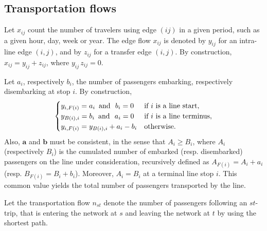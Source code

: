 \documentclass{llncs}
\begin{document}
\subsection{Transportation flows}
\label{Transportation flows}
Let  $x_{ij}$ count the number of travelers using edge $(ij)$ in a given period, such as a given hour, day, week or  year.  The edge flow $x_{ij}$ is denoted by $y_{ij}$ for an intra-line edge $(i,j)$, and 
by $z_{ij}$ for a transfer edge $(i,j)$. By construction, $x_{ij}=y_{ij}+z_{ij}$, where $y_{ij}\,  z_{ij}=0$. 

\vspace*{0.1cm}


Let $a_i$, respectively $b_i$, the number of passengers embarking, respectively disembarking at stop $i$. By construction, 
\begin{equation}
\label{bilan1ligne}
\begin{cases}
 y_{i,F(i)}=a_i \text{\,  and } b_i=0   & \text{if $i$ is a line start}, \\
y_{B(i),i}=b_i \text{\,  and } a_i=0   & \text{if $i$ is a line terminus}, \\
 y_{i,F(i)}=y_{B(i),i}+a_i-b_i     & \text{otherwise}.
\end{cases}
\end{equation}
Also, $\mathbf{a}$ and $\mathbf{b}$ must be consistent, in the sense that $A_i\ge B_i$, where $A_i$ (respectively $B_i$) is the cumulated number of embarked 
(resp. disembarked) passengers on the line under consideration, recursively defined as $A_{F(i)}=A_i+a_i$ (resp. $B_{F(i)}=B_i+b_i$). Moreover,  $A_i=B_i$ at a terminal line stop $i$. This common value yields  the total number of passengers transported by the line. 



\vspace*{0.1cm}

Let the transportation flow $n_{st}$ denote the number of passengers following an $st$-trip, that is entering the network at $s$ and leaving the network at $t$ by using the shortest path. 
\end{document}
